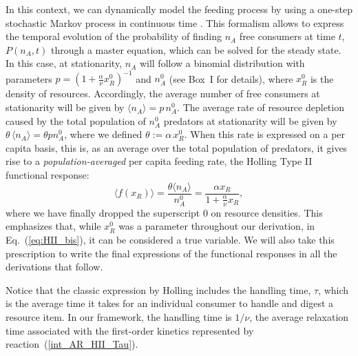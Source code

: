 In this context, we can dynamically model the feeding process by using a one-step stochastic Markov process in continuous time \citep{Black2012}.  This formalism allows to express the temporal evolution of the probability of finding $n_A$ free consumers at time $t$, $P(n_A,t)$ through a master equation, which can be solved for the steady state. In this case, at stationarity, $n_A$ will follow a binomial distribution with parameters $p = \left(1 + \frac{\alpha}{\nu} x_R^0\right)^{-1}$ and $n_A^0$ (see Box~I for details), where $x_R^0$ is the density of resources. Accordingly, the average number of free consumers at stationarity will be given by $\langle n_A \rangle= p\,n_A^0$. The average rate of resource depletion caused by the total population of $n_A^0$ predators at stationarity will be given by $\theta\,\langle n_A \rangle = \theta p n_A^0$, where we defined $\theta:=\alpha\,x_R^0$. When this rate is expressed on a per capita basis, this is, as an average over the total population of predators, it gives rise to a {\em population-averaged} per capita feeding rate, the Holling Type II functional response: 
\begin{equation}
\langle f(x_R) \rangle = 
\frac{\theta \langle n_A\rangle}{n_A^0} =
\frac{\alpha x_R}{1 + \frac{\alpha}{\nu} x_R},
\label{eq:HII_bis}
\end{equation}
where we have finally dropped the superscript 0 on resource densities. This emphasizes that, while $x^0_R$ was a parameter throughout our derivation, in Eq.~(\ref{eq:HII_bis}), it can be considered a true variable. We will also take this prescription to write the final expressions of the functional responses in all the derivations that follow. 
\smallskip

Notice that the classic expression by Holling includes the handling time, $\tau$, which is the average time it takes for an individual consumer to handle and digest a resource item. In our framework, the handling time is $1/\nu$, the average relaxation time associated with the first-order kinetics represented by reaction~(\ref{int_AR_HII_Tau}).   

